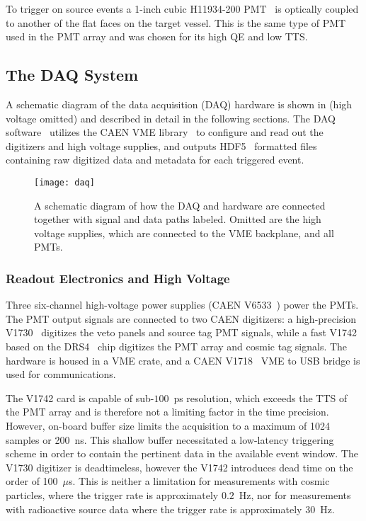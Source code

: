 To trigger on source events a  1-inch cubic H11934-200  PMT~\cite{h11934} is optically coupled to another of the flat faces on the target vessel. This is the same type of PMT used in the PMT array and was chosen for its high QE and low TTS. 

\subsection{The DAQ System \label{sec:daq}}

A schematic diagram of the data acquisition (DAQ) hardware is shown in   (high voltage omitted) and described in detail in the following sections. 
The DAQ software~\cite{wblsdaq} utilizes the CAEN VME library~\cite{caen-vme} to configure and read out the digitizers and high voltage supplies, and outputs HDF5~\cite{hdf5} formatted files containing raw digitized data and metadata for each triggered event.

\begin{figure}
\texttt{[image: daq]}
\caption{A schematic diagram of how the DAQ and hardware are connected together with signal and data paths labeled. Omitted are the high voltage supplies, which are connected to the VME backplane, and all PMTs.}
\label{fig:daq}
\end{figure}


\subsubsection{Readout Electronics and High Voltage}
Three six-channel high-voltage power supplies (CAEN V6533~\cite{v6533}) power the PMTs. 
The PMT output signals are connected to two CAEN digitizers: a high-precision V1730~\cite{v1730} digitizes the veto panels and source tag PMT signals, while a fast V1742~\cite{v1742} based on the DRS4~\cite{drs4} chip digitizes the PMT array and cosmic tag signals.  The hardware is housed in a VME crate, and a CAEN V1718~\cite{v1718} VME to USB bridge is used for communications.  

The V1742 card is capable of sub-$100$~ps resolution, which exceeds the TTS of the PMT array and is therefore not a limiting factor in the time precision.  However, on-board buffer size limits the acquisition to a maximum of 1024 samples or 200~ns. This shallow buffer necessitated a low-latency triggering scheme in order to contain the pertinent data in the available event window. The V1730 digitizer is deadtimeless, however the V1742 introduces dead time on the order of 100~$\mu$s.  This is neither a limitation for measurements with cosmic particles, where the trigger rate is approximately $0.2$~Hz, nor for measurements with radioactive source data where the trigger rate is approximately $30$~Hz.  
  


